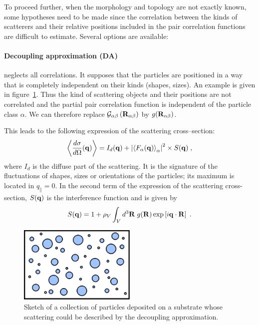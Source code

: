 To proceed further, when the morphology and topology are not exactly known, some hypotheses need to be made since the correlation between the kinds of scatterers and their relative positions included in the pair correlation functions are difficult to estimate. Several options are available:

\paragraph{Decoupling approximation (DA)} neglects all correlations. It supposes that the particles are positioned in a way that is completely independent on their kinds (shapes, sizes). An example is given in figure~\ref{fig:da}. Thus the kind of scattering objects and their positions are not correlated and the partial pair correlation function is independent of the particle class $\alpha$. We can therefore replace $ \mathcal{G}_{\alpha \beta}\left( \mathbf{R}_{\alpha \beta} \right)$ by  $g(\mathbf{R}_{\alpha\beta})$.

This leads to the following expression of the scattering cross--section:
\begin{equation*}
\left\langle \frac{d\sigma}{d\Omega}(\mathbf{q}) \right\rangle  = I_d(\mathbf{q}) + \left\lvert \left\langle F_\alpha(\mathbf{q}) \right\rangle_\alpha \right\rvert ^2 \times S(\mathbf{q}) \; ,
\end{equation*}
where $I_d$ is the diffuse part of the scattering. It is the signature of the fluctuations of shapes, sizes or orientations of the particles; its maximum is located in $q_{\parallel}=0$. In the second term of the expression of the scattering cross-section, $S(\mathbf{q})$ is the interference function and is given by
\begin{equation*} 
  S(\mathbf{q}) = 1+ \rho_V \int_V d^3\mathbf{R} \; g(\mathbf{R}) \exp \left[ i\mathbf{q}\cdot \mathbf{R} \right] \; .
\end{equation*}


\begin{figure}[ht]
\begin{center}
\includegraphics[width=0.5\textwidth]{Figures/drawing/drawingDA.eps}
\end{center}
\caption{Sketch of a collection of particles deposited on a substrate whose scattering  could be described by the decoupling approximation.}
\label{fig:da}
\end{figure}


